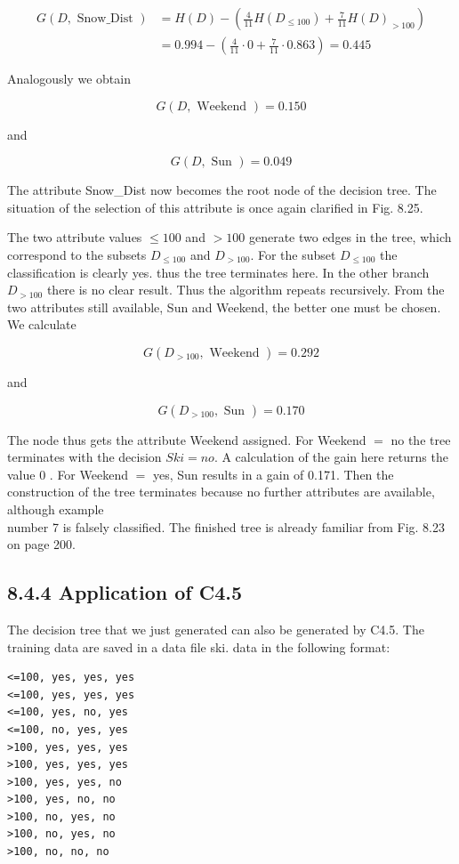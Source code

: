 \documentclass[10pt]{article}
\begin{document}
$$
\begin{aligned}
G(D, \text { Snow_Dist }) & =H(D)-\left(\frac{4}{11} H\left(D_{\leq 100}\right)+\frac{7}{11} H(D)_{>100}\right) \\
& =0.994-\left(\frac{4}{11} \cdot 0+\frac{7}{11} \cdot 0.863\right)=0.445
\end{aligned}
$$

Analogously we obtain

$$
G(D, \text { Weekend })=0.150
$$

and

$$
G(D, \text { Sun })=0.049
$$

The attribute Snow\_Dist now becomes the root node of the decision tree. The situation of the selection of this attribute is once again clarified in Fig. 8.25.

The two attribute values $\leq 100$ and $>100$ generate two edges in the tree, which correspond to the subsets $D_{\leq 100}$ and $D_{>100}$. For the subset $D_{\leq 100}$ the classification is clearly yes. thus the tree terminates here. In the other branch $D_{>100}$ there is no clear result. Thus the algorithm repeats recursively. From the two attributes still available, Sun and Weekend, the better one must be chosen. We calculate

$$
G\left(D_{>100}, \text { Weekend }\right)=0.292
$$

and

$$
G\left(D_{>100}, \text { Sun }\right)=0.170
$$

The node thus gets the attribute Weekend assigned. For Weekend $=$ no the tree terminates with the decision $S k i=n o$. A calculation of the gain here returns the value 0 . For Weekend $=$ yes, Sun results in a gain of 0.171. Then the construction of the tree terminates because no further attributes are available, although example\\
number 7 is falsely classified. The finished tree is already familiar from Fig. 8.23 on page 200.

\subsection*{8.4.4 Application of C4.5}
The decision tree that we just generated can also be generated by C4.5. The training data are saved in a data file ski. data in the following format:

\begin{verbatim}
<=100, yes, yes, yes
<=100, yes, yes, yes
<=100, yes, no, yes
<=100, no, yes, yes
>100, yes, yes, yes
>100, yes, yes, yes
>100, yes, yes, no
>100, yes, no, no
>100, no, yes, no
>100, no, yes, no
>100, no, no, no
\end{verbatim}
\end{document}
